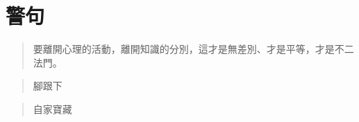 \chapter{警句}

\begin{quote}
  要離開心理的活動，離開知識的分別，這才是無差別、才是平等，才是不二法門。
\end{quote}

\begin{quote}
腳跟下
\end{quote}

\begin{quote}
自家寶藏
\end{quote}

\begin{quote}

\end{quote}

\begin{quote}

\end{quote}

\begin{quote}

\end{quote}

\begin{quote}

\end{quote}

